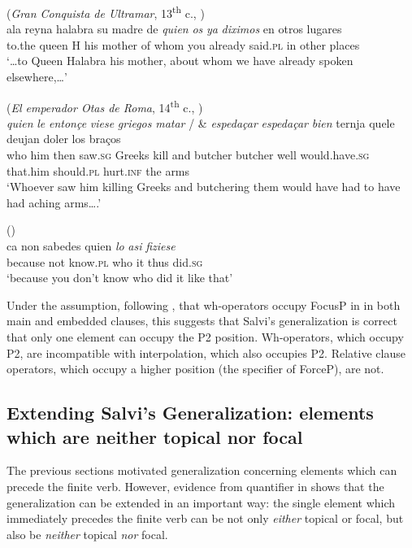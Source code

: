 \documentclass[output=paper]{LSP/langsci}
\begin{document}
\ea%
    \label{ex:poole:11}
    (\textit{Gran Conquista de Ultramar}, 13\textsuperscript{th} c., \citealt[(52)]{Poole2013})\\    
    \gll    ala reyna halabra su madre de \textit{quien} \textit{os} \textit{ya} \textit{diximos} en otros lugares  \\
	    to.the queen H his mother of whom you already said.\textsc{pl} in other places\\
    \glt ‘…to Queen Halabra his mother, about whom we have already spoken elsewhere,…’
    \z

\ea%
    \label{ex:poole:12}
(\textit{El emperador Otas de Roma}, 14\textsuperscript{th} c., \citealt[(53)]{Poole2013})\\    
    \gll    \emph{quien} \emph{le} \emph{entonçe} \emph{viese} \emph{griegos} \emph{matar} / \& \emph{espedaçar} \emph{espedaçar} \emph{bien} ternja quele deujan doler los braços  \\
	     who him then saw.\textsc{sg} Greeks kill {} and butcher butcher well would.have.\textsc{sg} that.him should.\textsc{pl} hurt.\textsc{inf} the arms \\
    \glt ‘Whoever saw him killing Greeks and butchering them would have had to have had aching arms….’
   \z


\ea%
    \label{ex:poole:13}(\citealt[(48)]{Poole2013})\\
    \gll * ca non sabedes quien \emph{lo} \emph{asi} \emph{fiziese}  \\
         {} because not know.\textsc{pl} who it thus did.\textsc{sg}	\\
    \glt ‘because you don’t know who did it like that’
 \z

\noindent Under the assumption, following \citet{Poole2013}, that wh-operators occupy FocusP in  in both main and embedded clauses, this suggests that Salvi’s generalization is correct that only one element can occupy the P2 position.  Wh-operators, which occupy P2, are incompatible with interpolation, which also occupies P2.  Relative clause operators, which occupy a higher position (the specifier of ForceP), are not.

\subsection{Extending Salvi’s Generalization:  elements which are neither topical nor focal}\label{sec:poole:2.6}
The previous sections motivated  generalization concerning elements which can precede the finite verb.  However, evidence from quantifier  in  \citep{Mackenzie2010} shows that the generalization can be extended in an important way:  the single element which immediately precedes the finite verb can be not only \textit{either} topical or focal, but also be \textit{neither} topical \textit{nor} focal.  
\end{document}
